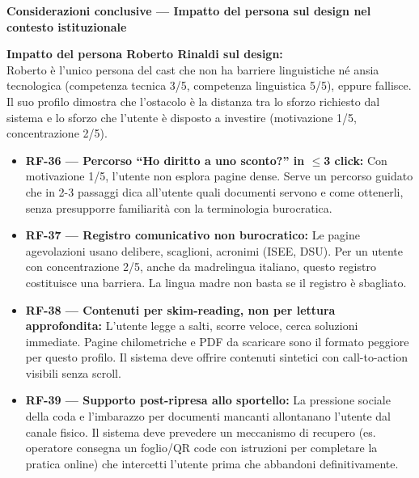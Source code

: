 ﻿\documentclass[11pt,a4paper]{article}
\begin{document}
\begin{tcolorbox}[sectionbox,colback=primaryColor!10]
    \textbf{Considerazioni conclusive --- Impatto del persona sul design nel contesto istituzionale}
\end{tcolorbox}

\vspace{0.3cm}

\begin{tcolorbox}[base]
    {\small
    \textbf{Impatto del persona Roberto Rinaldi sul design:} \\[4pt]
    Roberto \`e l'unico persona del cast che non ha barriere linguistiche n\'e ansia tecnologica (competenza tecnica 3/5, competenza linguistica 5/5), eppure fallisce. Il suo profilo dimostra che l'ostacolo \`e la distanza tra lo sforzo richiesto dal sistema e lo sforzo che l'utente \`e disposto a investire (motivazione 1/5, concentrazione 2/5).

    \begin{itemize}[leftmargin=*]
        \item \textbf{RF-36 --- Percorso ``Ho diritto a uno sconto?'' in $\leq$3 click:} Con motivazione 1/5, l'utente non esplora pagine dense. Serve un percorso guidato che in 2-3 passaggi dica all'utente quali documenti servono e come ottenerli, senza presupporre familiarità con la terminologia burocratica.

        \item \textbf{RF-37 --- Registro comunicativo non burocratico:} Le pagine agevolazioni usano delibere, scaglioni, acronimi (ISEE, DSU). Per un utente con concentrazione 2/5, anche da madrelingua italiano, questo registro costituisce una barriera. La lingua madre non basta se il registro è sbagliato.

        \item \textbf{RF-38 --- Contenuti per skim-reading, non per lettura approfondita:} L'utente legge a salti, scorre veloce, cerca soluzioni immediate. Pagine chilometriche e PDF da scaricare sono il formato peggiore per questo profilo. Il sistema deve offrire contenuti sintetici con call-to-action visibili senza scroll.

        \item \textbf{RF-39 --- Supporto post-ripresa allo sportello:} La pressione sociale della coda e l'imbarazzo per documenti mancanti allontanano l'utente dal canale fisico. Il sistema deve prevedere un meccanismo di recupero (es. operatore consegna un foglio/QR code con istruzioni per completare la pratica online) che intercetti l'utente prima che abbandoni definitivamente.
    \end{itemize}
    }
\end{tcolorbox}
\end{document}
